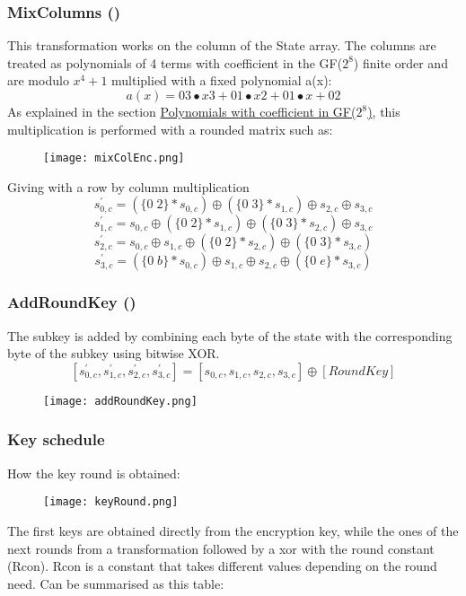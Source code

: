 \documentclass{article}
\begin{document}
\subsubsection{MixColumns ()}
This transformation works on the column of the State array. The columns are treated as polynomials of 4 terms with coefficient in the GF($2^8$) finite order and are modulo $x^4+1$ multiplied with a fixed polynomial a(x):
 \[a(x) = {03}•x3 + {01}•x2+ {01}•x + {02}\]
As explained in the section \hyperref[sec:polyGF]{Polynomials with coefficient in GF($2^8$)}, this multiplication is performed with a rounded matrix such as:
\begin{figure}[H]
	\begin{center}
  		\texttt{[image: mixColEnc.png]} 
 	\end{center}
\end{figure}
Giving with a row by column multiplication
\[s^{'}_{0,c} = (\{0\;2\} * s_{0,c}) \oplus  (\{0\;3\} * s_{1,c}) \oplus  s_{2,c} \oplus  s_{3,c}\]
\[s^{'}_{1,c} = s_{0,c} \oplus  (\{0\;2\} * s_{1,c}) \oplus  (\{0\;3\} * s_{2,c}) \oplus  s_{3,c}\]
\[s^{'}_{2,c}= s_{0,c} \oplus    s_{1,c} \oplus (\{0\;2\} * s_{2,c}) \oplus (\{0\;3\} * s_{3,c} )\]
\[s^{'}_{3,c}= (\{0\;b\} * s_{0,c} ) \oplus  s_{1,c} \oplus  s_{2,c} \oplus  (\{0\;e\} * s_{3,c} )\]

\subsubsection{AddRoundKey ()}
The subkey is added by combining each byte of the state with the corresponding byte of the subkey using bitwise XOR.
 \[[ s^{'}_{0,c} , s^{'}_{1,c} , s^{'}_{2,c} , s^{'}_{3,c} ] = [ s_{0,c} , s_{1,c} , s_{2,c} , s_{3,c} ] \oplus [  RoundKey ] \]

\begin{figure}[H]
	\begin{center}
  		\texttt{[image: addRoundKey.png]} 
 	\end{center}
\end{figure}

\subsubsection{Key schedule}
How the key round is obtained:
\begin{figure}[htb]
	\begin{center}
  		\texttt{[image: keyRound.png]} 
 	\end{center}
\end{figure}
The first keys are obtained directly from the encryption key, while the ones of the next rounds from a transformation followed by a xor with the round constant (Rcon). Rcon is a constant that takes different values depending on the round need. Can be summarised as this table:
\end{document}
